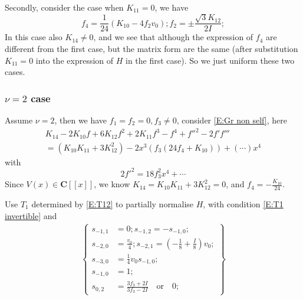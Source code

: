 \documentclass[11pt]{article}
\theoremstyle{definition}
\theoremstyle{plain}
\numberwithin{equation}{section}
\begin{document}
Secondly, consider the case when $K_{11}=0$, we have 
$$
f_4=\frac{1}{24} (K_{10}-4 f_2 v_0); f_2=\pm \frac{\sqrt{3} K_{12}}{2 I};
$$
In this case also $K_{14}\neq 0$, and we see that although the expression of $f_4$ are different from the first case, but the matrix form are the same (after substitution $K_{11}=0$ into the expression of $H$ in the first case). So we just uniform these two cases.

\subsubsection{$\nu=2$ case}

Assume $\nu=2$, then we have $f_1=f_2=0,f_3\neq 0$, consider \eqref{E:Gr non self}, here 
\begin{multline*}
	K_{14}-2K_{10}f+6K_{12}f^2+2K_{11}f^3-f^4+f''^2-2f'f'''
	\\=(K_{10} K_{11}+3 K_{12}^2)-2 x^3 (f_3 (24 f_4+K_{10}))+(\cdots)x^4
\end{multline*}
with
$$
2f'^2=18f_3^2x^4+\cdots
$$
Since $V(x)\in \mathbf{C}[[x]]$, we know $K_{14}=K_{10} K_{11}+3 K_{12}^2=0$, and $f_4=-\frac{K_{10}}{24}$.

Use $T_1$ determined by \eqref{E:T12} to partially normalise $H$, with condition \eqref{E:T1 invertible} and 
\begin{align}
	\label{E:Second conjugation nonself v=2}
	\left\{\begin{aligned}
		s_{-1,1}&=0;s_{-1,2}=-s_{-1,0};
		\\s_{-2,0}&=\frac{v_0}{4};s_{-2,1}=(-\frac{1}{8}+\frac{I}{8}) v_0;
		\\s_{-3,0}&=\frac{1}{4} v_0 s_{-1,0};
		\\ s_{-1,0}&=1;
		\\s_{0,2}&= \frac{3 f_3+2 I}{3 f_3-2 I}\quad \text{or}\quad 0;
		\end{aligned}\right\}
\end{align}
\end{document}
